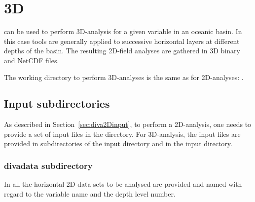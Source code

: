 \chapter{\diva 3D\label{chap:diva3D}}

\diva can be used to perform 3D-analysis for a given variable in an oceanic basin. In this case \diva tools are generally applied to successive horizontal layers at different depths of the basin. The resulting 2D-field analyses are gathered in 3D binary and NetCDF files.

The working directory to perform 3D-analyses is the same as for 2D-analyses: \linebreak {}.


\minitoc

\section{Input subdirectories}

As described in Section~\ref{sec:diva2Dinput}, to perform a 2D-analysis, one needs to provide a set of input files in the  directory. For 3D-analysis, the input files are provided in subdirectories of the input directory and in the input directory.

\subsection[divadata subdirectory]{divadata subdirectory}

In   all the horizontal 2D data sets to be analysed are provided and named with regard to the variable name and the depth level number.

\begin{center}
\end{center}

